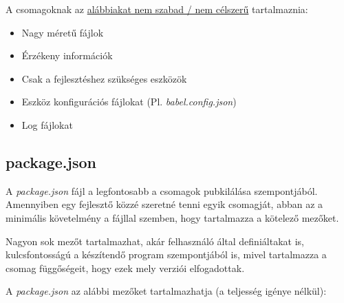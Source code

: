A csomagoknak az \underline{alábbiakat nem szabad / nem célszerű} tartalmaznia:

\begin{itemize}
	\item Nagy méretű fájlok
	\item Érzékeny információk
	\item Csak a fejlesztéshez szükséges eszközök
	\item Eszköz konfigurációs fájlokat (Pl. \emph{babel.config.json})
	\item Log fájlokat
\end{itemize}

\begin{flushright}
	\cite{npm-packages}
\end{flushright}

	\subsection{package.json}
	
	A \emph{package.json} fájl a legfontosabb a csomagok pubkilálása szempontjából. Amennyiben egy fejlesztő közzé szeretné tenni egyik csomagját, abban az a minimális követelmény a fájllal szemben, hogy tartalmazza a kötelező mezőket.
	
	Nagyon sok mezőt tartalmazhat, akár felhasználó által definiáltakat is, kulcsfontosságú a készítendő program szempontjából is, mivel tartalmazza a csomag függőségeit, hogy ezek mely verziói elfogadottak.
	
	A \emph{package.json} az alábbi mezőket tartalmazhatja (a teljesség igénye nélkül):
	
